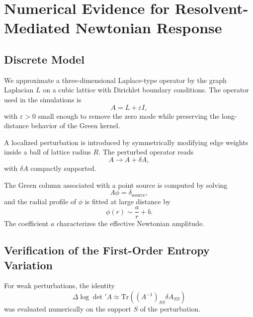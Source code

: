 \section{Numerical Evidence for Resolvent-Mediated Newtonian Response}
  \label{sec:numerical-evidence-for-resolvent-mediated-newtonian-response}

  \subsection{Discrete Model}

    We approximate a three-dimensional Laplace-type operator by the
    graph Laplacian $L$ on a cubic lattice with Dirichlet boundary conditions.
    The operator used in the simulations is
    \begin{equation}
      A = L + \varepsilon I,
    \end{equation}
    with $\varepsilon > 0$ small enough to remove the zero mode while
    preserving the long-distance behavior of the Green kernel.

    A localized perturbation is introduced by symmetrically modifying
    edge weights inside a ball of lattice radius $R$.
    The perturbed operator reads
    \begin{equation}
      A \longrightarrow A + \delta A,
    \end{equation}
    with $\delta A$ compactly supported.

    The Green column associated with a point source is computed by solving
    \begin{equation}
      A \phi = \delta_{\mathrm{source}},
    \end{equation}
    and the radial profile of $\phi$ is fitted at large distance by
    \begin{equation}
      \phi(r) \sim \frac{a}{r} + b.
    \end{equation}
    The coefficient $a$ characterizes the effective Newtonian amplitude.

  \subsection{Verification of the First-Order Entropy Variation}

    For weak perturbations, the identity
    \begin{equation}
      \Delta \log \det{}' A
      \approx
      \mathrm{Tr}((A^{-1})_{SS} \delta A_{SS})
    \end{equation}
    was evaluated numerically on the support $S$ of the perturbation.

